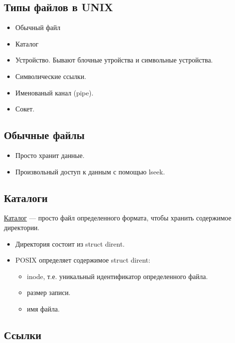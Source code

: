 \subsection{Типы файлов в UNIX}

\begin{itemize}
	\item Обычный файл
	\item Каталог
	\item Устройство. Бывают блочные утройства и символьные устройства.
	\item Символические ссылки.
	\item Именованый канал (pipe).
	\item Сокет.
\end{itemize}

\subsection{Обычные файлы}

\begin{itemize}
	\item Просто хранит данные.
	\item Произвольный доступ к данным с помощью lseek.
\end{itemize}

\subsection{Каталоги}

\begin{Def}
	\underline{Каталог} --- просто файл определенного формата, чтобы хранить содержимое
	директории.
\end{Def}

\begin{itemize}
	\item Директория состоит из struct dirent.
	\item POSIX определяет содержимое struct dirent:
		\begin{itemize}
			\item inode, т.е. уникальный идентификатор определенного файла.
			\item размер записи.
			\item имя файла.
		\end{itemize}
\end{itemize}

\subsection{Ссылки}

